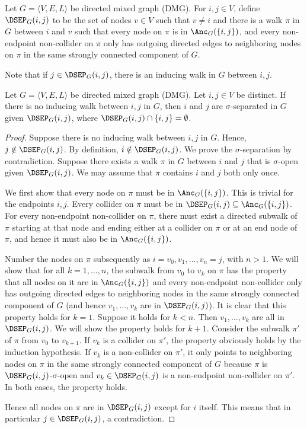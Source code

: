 \begin{Def}\label{def:DSEP}
  Let $G = \langle V, E, L \rangle$ be directed mixed graph (DMG). 
  For $i,j \in V$, define $\DSEP_G(i,j)$ to be the set of nodes $v \in V$ such that
  $v \ne i$ and there is a walk $\pi$ in $G$ between $i$ and $v$ such that every node
  on $\pi$ is in $\Anc_G(\{i,j\})$, and 
  every non-endpoint non-collider on $\pi$ only has outgoing directed edges to neighboring nodes on $\pi$ in the same strongly connected component of $G$.
\end{Def}
Note that if $j \in \DSEP_G(i,j)$, there is an inducing walk in $G$ between $i,j$.
\begin{Prp}\label{prp:DSEP}
  Let $G = \langle V, E, L \rangle$ be directed mixed graph (DMG). 
  Let $i,j \in V$ be distinct.
  If there is no inducing walk between $i,j$ in $G$, then $i$ and $j$ are $\sigma$-separated in $G$ given $\DSEP_G(i,j)$,
  where $\DSEP_G(i,j) \cap \{i,j\} = \emptyset$.
\end{Prp}
\begin{proof}
  Suppose there is no inducing walk between $i,j$ in $G$.
  Hence, $j \notin \DSEP_G(i,j)$.
  By definition, $i \notin \DSEP_G(i,j)$.
  We prove the $\sigma$-separation by contradiction.
  Suppose there exists a walk $\pi$ in $G$ between $i$ and $j$ that is $\sigma$-open given $\DSEP_G(i,j)$.
  We may assume that $\pi$ contains $i$ and $j$ both only once.

  We first show that every node on $\pi$ must be in $\Anc_G(\{i,j\})$.
  This is trivial for the endpoints $i,j$.
  Every collider on $\pi$ must be in $\DSEP_G(i,j) \subseteq \Anc_G(\{i,j\})$.
  For every non-endpoint non-collider on $\pi$,
  there must exist a directed subwalk of $\pi$ starting at that node and ending either at a collider on $\pi$ or at an end node of $\pi$, and hence it must also be in $\Anc_G(\{i,j\})$. 

  Number the nodes on $\pi$ subsequently as $i = v_0, v_1, \dots, v_n = j$, with $n > 1$.
  We will show that for all $k = 1,\dots,n$, the subwalk from $v_0$ to $v_k$ on $\pi$ has the property that all nodes on it are in $\Anc_G(\{i,j\})$ and every non-endpoint non-collider only has outgoing directed edges to neighboring nodes in the same strongly connected component of $G$ (and hence $v_1,\dots,v_k$ are in $\DSEP_G(i,j)$).
  It is clear that this property holds for $k=1$. 
  Suppose it holds for $k < n$.
  Then $v_1,\dots,v_k$ are all in $\DSEP_G(i,j)$.
  We will show the property holds for $k+1$.
  Consider the subwalk $\pi'$ of $\pi$ from $v_0$ to $v_{k+1}$.
  If $v_{k}$ is a collider on $\pi'$, the property obviously holds by the induction hypothesis.
  If $v_{k}$ is a non-collider on $\pi'$, it only points to neighboring nodes on $\pi$ in the same strongly connected component of $G$ because $\pi$ is $\DSEP_G(i,j)$-$\sigma$-open and $v_k \in \DSEP_G(i,j)$ is a non-endpoint non-collider on $\pi'$.
  In both cases, the property holds.

  Hence all nodes on $\pi$ are in $\DSEP_G(i,j)$ except for $i$ itself.
  This means that in particular $j \in \DSEP_G(i,j)$, a contradiction.
\end{proof}


